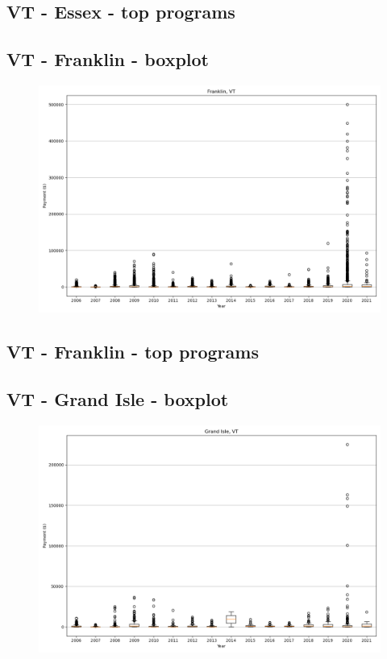 \subsection*{VT - Essex - top programs}

\newpage
\subsection*{VT - Franklin - boxplot}
\begin{figure}[h]
\centering
\includegraphics[width=7in]{../output/boxplots/counties/Franklin-VT_boxplot.png}
\end{figure}


\subsection*{VT - Franklin - top programs}

\newpage
\subsection*{VT - Grand Isle - boxplot}
\begin{figure}[h]
\centering
\includegraphics[width=7in]{../output/boxplots/counties/Grand Isle-VT_boxplot.png}
\end{figure}


